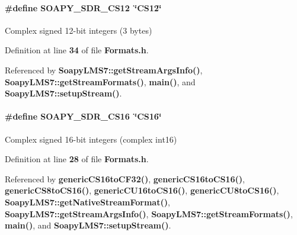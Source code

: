 \paragraph[{S\+O\+A\+P\+Y\+\_\+\+S\+D\+R\+\_\+\+C\+S12}]{\setlength{\rightskip}{0pt plus 5cm}\#define S\+O\+A\+P\+Y\+\_\+\+S\+D\+R\+\_\+\+C\+S12~\char`\"{}C\+S12\char`\"{}}\label{Formats_8h_adf1b8a77b59043d266bd1c4a6cc43424}


Complex signed 12-\/bit integers (3 bytes) 



Definition at line {\bf 34} of file {\bf Formats.\+h}.



Referenced by {\bf Soapy\+L\+M\+S7\+::get\+Stream\+Args\+Info()}, {\bf Soapy\+L\+M\+S7\+::get\+Stream\+Formats()}, {\bf main()}, and {\bf Soapy\+L\+M\+S7\+::setup\+Stream()}.

\paragraph[{S\+O\+A\+P\+Y\+\_\+\+S\+D\+R\+\_\+\+C\+S16}]{\setlength{\rightskip}{0pt plus 5cm}\#define S\+O\+A\+P\+Y\+\_\+\+S\+D\+R\+\_\+\+C\+S16~\char`\"{}C\+S16\char`\"{}}\label{Formats_8h_a2c4594ae71fa4f069c7ee09cdcd35532}


Complex signed 16-\/bit integers (complex int16) 



Definition at line {\bf 28} of file {\bf Formats.\+h}.



Referenced by {\bf generic\+C\+S16to\+C\+F32()}, {\bf generic\+C\+S16to\+C\+S16()}, {\bf generic\+C\+S8to\+C\+S16()}, {\bf generic\+C\+U16to\+C\+S16()}, {\bf generic\+C\+U8to\+C\+S16()}, {\bf Soapy\+L\+M\+S7\+::get\+Native\+Stream\+Format()}, {\bf Soapy\+L\+M\+S7\+::get\+Stream\+Args\+Info()}, {\bf Soapy\+L\+M\+S7\+::get\+Stream\+Formats()}, {\bf main()}, and {\bf Soapy\+L\+M\+S7\+::setup\+Stream()}.

